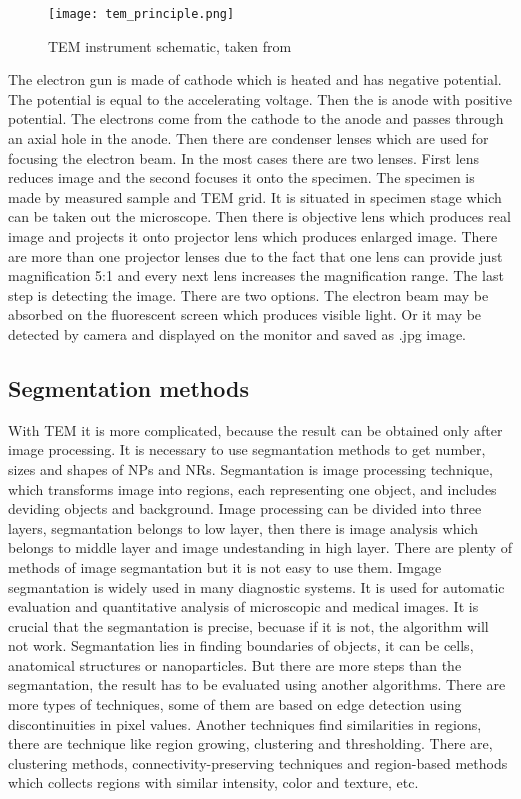         \begin{figure}[h]
            \centerline{\texttt{[image: tem\_principle.png]}}
            \caption{TEM instrument schematic, taken from~\cite{20}}
            \label{fig:TEM}
        \end{figure}

        The electron gun is made of cathode which is heated and has negative potential. The potential is equal to the accelerating voltage. Then the is anode with positive potential.
        The electrons come from the cathode to the anode and passes through an axial hole in the anode. Then there are condenser lenses which are used for focusing the electron beam.
        In the most cases there are two lenses. First lens reduces image and the second focuses it onto the specimen. The specimen is made by measured sample and TEM grid.
        It is situated in specimen stage which can be taken out the microscope. Then there is objective lens which produces real image and projects it onto projector lens
        which produces enlarged image. There are more than one projector lenses due to the fact that one lens can provide just magnification 5:1
        and every next lens increases the magnification range. The last step is detecting the image. There are two options. The electron beam may be absorbed on the fluorescent screen
        which produces visible light. Or it may be detected by camera and displayed on the monitor and saved as .jpg image. \cite{7}

\subsection{Segmentation methods}

        With TEM it is more complicated, because the result can be obtained only after image processing. It is necessary to use segmantation methods to get number, sizes and shapes of
        NPs and NRs. Segmantation is image processing technique, which transforms image into regions, each representing one object, and includes deviding objects and background.
        Image processing can be divided into three layers, segmantation belongs to low layer, then there is image analysis which belongs to middle layer and image undestanding in high layer.
        There are plenty of methods of image segmantation but it is not easy to use them. Imgage segmantation is widely used in many diagnostic systems.
        It is used for automatic evaluation and quantitative analysis of microscopic and medical images. It is crucial that the segmantation is precise, becuase if it is not,
        the algorithm will not work. Segmantation lies in finding boundaries of objects, it can be cells, anatomical structures or nanoparticles.
        But there are more steps than the segmantation, the result has to be evaluated using another algorithms. There are more types of techniques, some of them are based on
        edge detection using discontinuities in pixel values. Another techniques find similarities in regions, there are technique like region growing, clustering and thresholding.
        There are, clustering methods, connectivity-preserving techniques and region-based methods which collects regions with similar intensity, color and texture, etc. \cite{1, 2, 15, 17}

